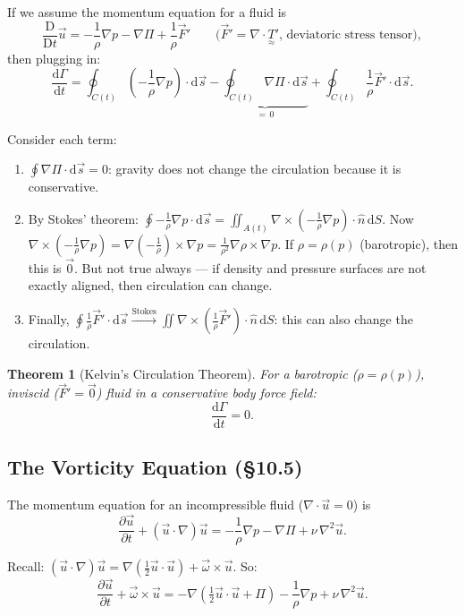 \documentclass[11pt,a4paper]{article}
\newtheorem{theorem}{Theorem}[section]
\newcommand{\D}{\mathrm{D}}
\newcommand{\Dt}{\frac{\D}{\D t}}
\newcommand{\pdt}[1]{\frac{\partial #1}{\partial t}}
\newcommand{\uv}{\vec{u}}
\newcommand{\nhat}{\hat{n}}
\newcommand{\omv}{\vec{\omega}}
\newcommand{\tens}[1]{\underset{\approx}{#1}}
\begin{document}
If we assume the momentum equation for a fluid is
\[
    \Dt\uv = -\frac{1}{\rho}\nabla p - \nabla\Pi + \frac{1}{\rho}\vec{F}' \qquad \text{($\vec{F}' = \nabla\cdot\tens{T}'$, deviatoric stress tensor)},
\]
then plugging in:
\[
    \frac{\mathrm{d}\Gamma}{\mathrm{d}t} = \oint_{C(t)} \left(-\frac{1}{\rho}\nabla p\right)\cdot\mathrm{d}\vec{s}
    - \underbrace{\oint_{C(t)} \nabla\Pi\cdot\mathrm{d}\vec{s}}_{=\,0}
    + \oint_{C(t)} \frac{1}{\rho}\vec{F}'\cdot\mathrm{d}\vec{s}.
\]

Consider each term:
\begin{enumerate}[label=(\roman*)]
    \item $\oint \nabla\Pi\cdot\mathrm{d}\vec{s} = 0$: gravity does not change the circulation because it is conservative.
    \item By Stokes' theorem: $\oint -\frac{1}{\rho}\nabla p\cdot\mathrm{d}\vec{s} = \iint_{A(t)} \nabla\times\!\left(-\frac{1}{\rho}\nabla p\right)\cdot\nhat\,\mathrm{d}S$. Now $\nabla\times\!\left(-\frac{1}{\rho}\nabla p\right) = \nabla\!\left(-\frac{1}{\rho}\right)\times\nabla p = \frac{1}{\rho^2}\nabla\rho\times\nabla p$. If $\rho = \rho(p)$ (barotropic), then this is $\vec{0}$. But not true always --- if density and pressure surfaces are not exactly aligned, then circulation can change.
    \item Finally, $\oint \frac{1}{\rho}\vec{F}'\cdot\mathrm{d}\vec{s} \xrightarrow{\text{Stokes}} \iint \nabla\times\!\left(\frac{1}{\rho}\vec{F}'\right)\cdot\nhat\,\mathrm{d}S$: this can also change the circulation.
\end{enumerate}

\begin{theorem}[Kelvin's Circulation Theorem]
For a barotropic ($\rho = \rho(p)$), inviscid ($\vec{F}' = \vec{0}$) fluid in a conservative body force field:
\[
    \boxed{\frac{\mathrm{d}\Gamma}{\mathrm{d}t} = 0.}
\]
\end{theorem}

\subsection{The Vorticity Equation (\S10.5)}

The momentum equation for an incompressible fluid ($\nabla\cdot\uv = 0$) is
\[
    \pdt{\uv} + (\uv\cdot\nabla)\uv = -\frac{1}{\rho}\nabla p - \nabla\Pi + \nu\,\nabla^2\uv.
\]

Recall: $(\uv\cdot\nabla)\uv = \nabla\!\left(\tfrac{1}{2}\uv\cdot\uv\right) + \omv\times\uv$. So:
\[
    \pdt{\uv} + \omv\times\uv = -\nabla\!\left(\tfrac{1}{2}\uv\cdot\uv + \Pi\right) - \frac{1}{\rho}\nabla p + \nu\,\nabla^2\uv.
\]
\end{document}

